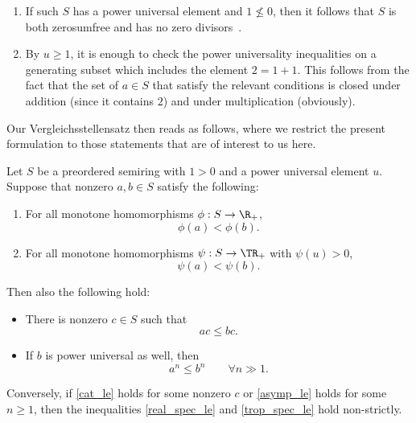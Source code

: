\begin{rema}
	\label{pu_rem}
	\begin{enumerate}
		\item If such $S$ has a power universal element and $1 \not\le 0$, then it follows that $S$ is both zerosumfree and has no zero divisors~\cite[Remark~3.36]{vergleichsstellensatz}.
		\item By $u \ge 1$, it is enough to check the power universality inequalities on a generating subset which includes the element $2 = 1 + 1$.
			This follows from the fact that the set of $a \in S$ that satisfy the relevant conditions is closed under addition (since it contains $2$) and under multiplication (obviously).
	\end{enumerate}
\end{rema}

Our Vergleichsstellensatz then reads as follows, where we restrict the present formulation to those statements that are of interest to us here.

\begin{thm}
	\label{vss}
	Let $S$ be a preordered semiring with $1 > 0$ and a power universal element $u$. Suppose that nonzero $a, b \in S$ satisfy the following:
	\begin{enumerate}
		\item\label{real_spec} For all monotone homomorphisms $\phi : S \to \R_+$,
			\begin{equation}
				\label{real_spec_le}
				\phi(a) < \phi(b).
			\end{equation}
		\item\label{trop_spec} For all monotone homomorphisms $\psi : S \to \TR_+$ with $\psi(u) > 0$,
			\begin{equation}
				\label{trop_spec_le}
				\psi(a) < \psi(b).
			\end{equation}
	\end{enumerate}
	Then also the following hold:
	\begin{itemize}
		\item There is nonzero $c \in S$ such that
			\begin{equation}
				\label{cat_le}
				a c \le b c.
			\end{equation}
		\item If $b$ is power universal as well, then
			\begin{equation}
				\label{asymp_le}
				a^n \le b^n \qquad \forall n \gg 1.
			\end{equation}
	\end{itemize}
	Conversely, if \eqref{cat_le} holds for some nonzero $c$ or \eqref{asymp_le} holds for some $n \ge 1$, then the inequalities \eqref{real_spec_le} and \eqref{trop_spec_le} hold non-strictly.
\end{thm}

